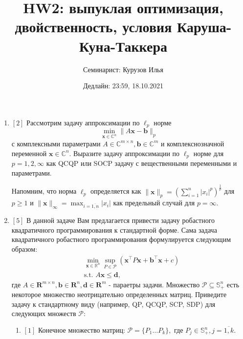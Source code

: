 \documentclass{article}
\title{HW2: выпуклая оптимизация, двойственность, условия Каруша-Куна-Таккера}
\author{Семинарист: Курузов Илья}
\date{Дедлайн: 23:59, 18.10.2021}
\begin{document}
\maketitle

\begin{enumerate}
\section{Выпуклая оптимизация}
    \item $[2]$ Рассмотрим задачу аппроксимации по  $\ell_p$ норме
    \begin{equation*}
        \min_{\mathbf{x}\in \mathbb{C}^n}\|A\mathbf{x}-\mathbf{b}\|_p
    \end{equation*}
    с комплексными параметрами $A\in\mathbb{C}^{m\times n}, \mathbf{b}\in\mathbb{C}^m$ и комплекснозначной переменной $\mathbf{x}\in\mathbb{C}^n$. Выразите задачу аппроксимации по $\ell_p$ норме для $p=1,2,\infty$ как QCQP или SOCP задачу с вещественными переменными и параметрами.
    
    Напомним, что норма $\ell_p$ определяется как 
    $\|\mathbf{x}\|_p = \left(\sum\limits_{i=1}^n |x_i|^p\right)^{\frac{1}{p}}$
    для $p\geq 1$ и $\|\mathbf{x}\|_\infty = \max_{i=\overline{1,n}}|x_i|$ как предельный случай для $p=\infty$.
    
    \item $[5]$ В данной задаче Вам предлагается привести задачу робастного квадратичного программирования к стандартной форме. Сама задача квадратичного робастного программирования формулируется следующим образом:
    \begin{equation}
    \begin{aligned}
                &\min_{\mathbf{x}\in\mathbb{R}^n} \sup_{P\in\mathcal{P}}\left(\mathbf{x}^\top P\mathbf{x} +\mathbf{b}^\top\mathbf{x}+c\right)\\
                &\text{s.t. } A\mathbf{x}\leq \mathbf{d},
    \end{aligned}
    \end{equation}
    где $A\in\mathbf{R}^{m\times n}, \mathbf{b}\in\mathbf{R}^n, \mathbf{d}\in\mathbf{R}^m$ - параетры задачи. Множество $\mathcal{P}\subseteq \mathbb{S}^n_{+}$ есть некоторое множество неотрицательно определенных матриц. Приведите задачу к стандартному виду (например, QP, QCQP, SCP, SDP) для следующих множеств $\mathcal{P}$:
    \begin{enumerate}[label=\alph*)]
        \item $[1]$ Конечное множество матриц: $\mathcal{P}=\{P_1\dots P_k\},\text{ где } P_j\in\mathbb{S}^n_+, j=\overline{1,k}$.
        

\end{enumerate}
\end{enumerate}
\end{document}
